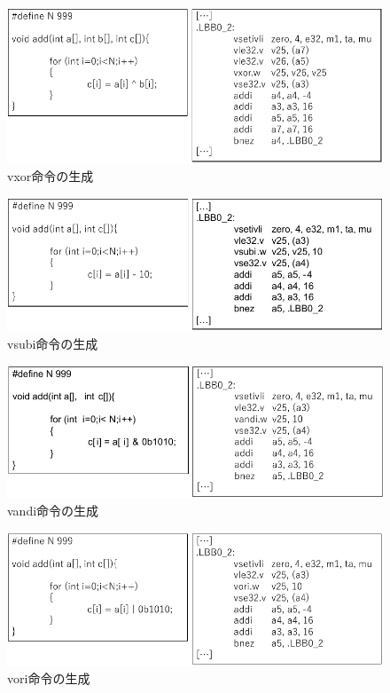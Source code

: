 \begin{figure}
    \centering
    \includegraphics[scale=0.8]{image/vxor.pdf}
    \caption{vxor命令の生成}
    \label{fig:vxor}
\end{figure}

\begin{figure}
    \centering
    \includegraphics[scale=0.8]{image/vsubi.pdf}
    \caption{vsubi命令の生成}
    \label{fig:vsubi}
\end{figure}

\begin{figure}
    \centering
    \includegraphics[scale=0.8]{image/vandi.pdf}
    \caption{vandi命令の生成}
    \label{fig:vandi}
\end{figure}

\begin{figure}
    \centering
    \includegraphics[scale=0.8]{image/vori.pdf}
    \caption{vori命令の生成}
    \label{fig:vori}
\end{figure}

